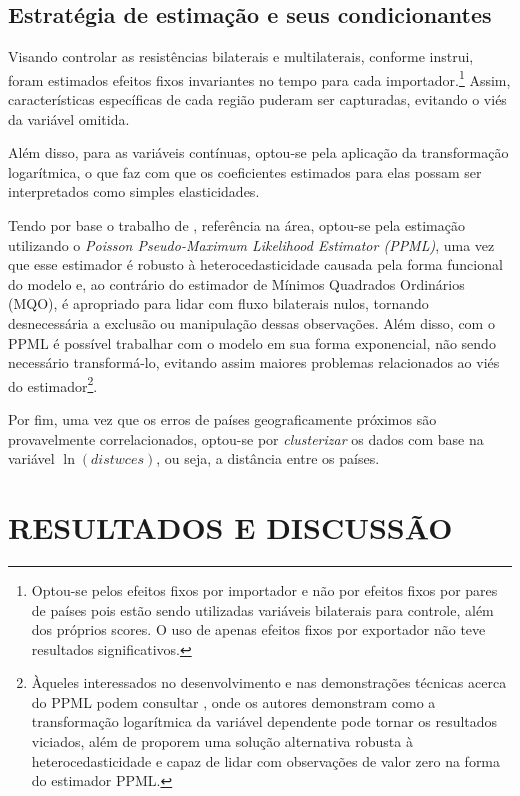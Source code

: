 \documentclass[12pt,
               openright,
               oneside,
               a4paper,
							 section=TITLE,     %
               subsection=Title,  %
               english,brazil]{article}
\begin{document}
\subsection{Estratégia de estimação e seus condicionantes}

Visando controlar as resistências bilaterais e multilaterais, conforme  instrui, foram estimados efeitos fixos invariantes no tempo para cada importador.\footnote{Optou-se pelos efeitos fixos por importador e não por efeitos fixos por pares de países pois estão sendo utilizadas variáveis bilaterais para controle, além dos próprios scores. O uso de apenas efeitos fixos por exportador não teve resultados significativos.} Assim, características específicas de cada região puderam ser capturadas, evitando o viés da variável omitida. 

Além disso, para as variáveis contínuas, optou-se pela aplicação da transformação logarítmica, o que faz com que os coeficientes estimados para elas possam ser interpretados como simples elasticidades.

Tendo por base o trabalho de , referência na área, optou-se pela estimação utilizando o \textit{Poisson Pseudo-Maximum Likelihood Estimator (PPML)}, uma vez que esse estimador é robusto à heterocedasticidade causada pela forma funcional do modelo e, ao contrário do estimador de Mínimos Quadrados Ordinários (MQO), é apropriado para lidar com fluxo bilaterais nulos, tornando desnecessária a exclusão ou manipulação dessas observações. Além disso, com o PPML é possível trabalhar com o modelo em sua forma exponencial, não sendo necessário transformá-lo, evitando assim maiores problemas relacionados ao viés do estimador\footnote{Àqueles interessados no desenvolvimento e nas demonstrações técnicas acerca do PPML podem consultar , onde os autores demonstram como a transformação logarítmica da variável dependente pode tornar os resultados viciados, além de proporem uma solução alternativa robusta à heterocedasticidade e capaz de lidar com observações de valor zero na forma do estimador PPML.}.

Por fim, uma vez que os erros de países geograficamente próximos são provavelmente correlacionados, optou-se por \textit{clusterizar} os dados com base na variável $\ln(distwces)$, ou seja, a distância entre os países.


\section{RESULTADOS E DISCUSSÃO}
\end{document}
